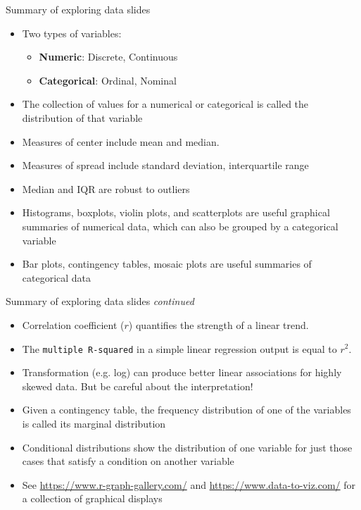 \documentclass[10pt]{beamer}\usepackage[]{graphicx}\usepackage[]{color}
\begin{document}
\begin{frame}{Summary of exploring data slides} 
	
\begin{itemize}
	\item Two types of variables:
	\begin{itemize}
		\item \textbf{Numeric}: Discrete, Continuous
		\item \textbf{Categorical}: Ordinal, Nominal
	\end{itemize}
\pause
\item The collection of values for a numerical or categorical is called the distribution of that variable
\pause
\item Measures of center include mean and median. 
\item Measures of spread include standard deviation, interquartile range
\item Median and IQR are robust to outliers
\pause
\item Histograms, boxplots, violin plots, and scatterplots are useful graphical summaries of numerical data, which can also be grouped by a categorical variable
\item Bar plots, contingency tables, mosaic plots are useful summaries of categorical data
\end{itemize}
\end{frame}

\begin{frame}{Summary of exploring data slides \textit{continued}} 
	
	\begin{itemize}
		\item Correlation coefficient ($r$) quantifies the strength of a linear trend. 
		\item The \texttt{multiple R-squared} in a simple linear regression output is equal to $r^2$. 
		\item Transformation (e.g. log) can produce better linear associations for highly skewed data. But be careful about the interpretation!
		\pause
		\item Given a contingency table, the frequency distribution of one of the variables is called its marginal distribution
		\item Conditional distributions show the distribution of one variable for just those cases that satisfy a condition on another variable
		\item See \url{https://www.r-graph-gallery.com/} and \url{https://www.data-to-viz.com/} for a collection of graphical displays
	\end{itemize}
\end{frame}
\end{document}
